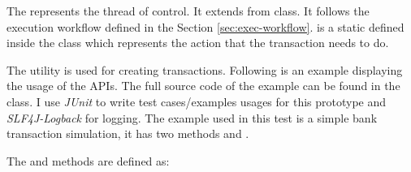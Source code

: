 \documentclass[../main]{subfiles}
\begin{document}
  The  represents the thread of control. It extends from  class. It follows the execution workflow defined in the Section \ref{sec:exec-workflow}.  is a static  defined inside the  class which represents the action that the transaction needs to do. \par

  The  utility is used for creating transactions. Following is an example displaying the usage of the APIs. The full source code of the example can be found in the  class. I use {\em JUnit} to write test cases/examples usages for this prototype and {\em SLF4J-Logback} for logging. The example used in this test is a simple bank transaction simulation, it has two methods  and . \par

  The  and  methods are defined as: \par
\end{document}
